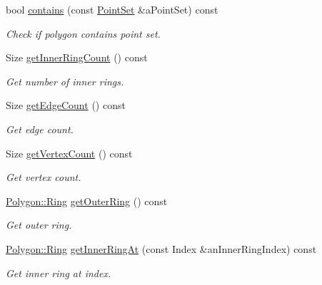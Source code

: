 \begin{DoxyCompactItemize}
bool \hyperlink{classlibrary_1_1math_1_1geom_1_1d2_1_1objects_1_1_polygon_a750ce732c80c9efafa534fc3ae9d8a6f}{contains} (const \hyperlink{classlibrary_1_1math_1_1geom_1_1d2_1_1objects_1_1_point_set}{Point\+Set} \&a\+Point\+Set) const
\begin{DoxyCompactList}\small\item\em Check if polygon contains point set. \end{DoxyCompactList}\item 
Size \hyperlink{classlibrary_1_1math_1_1geom_1_1d2_1_1objects_1_1_polygon_a20d245deda49667f0418591d7772d53d}{get\+Inner\+Ring\+Count} () const
\begin{DoxyCompactList}\small\item\em Get number of inner rings. \end{DoxyCompactList}\item 
Size \hyperlink{classlibrary_1_1math_1_1geom_1_1d2_1_1objects_1_1_polygon_ac01b8f978e663f09ef0f7a91de7720ce}{get\+Edge\+Count} () const
\begin{DoxyCompactList}\small\item\em Get edge count. \end{DoxyCompactList}\item 
Size \hyperlink{classlibrary_1_1math_1_1geom_1_1d2_1_1objects_1_1_polygon_aece2a526c36bbd641588e9742228fb08}{get\+Vertex\+Count} () const
\begin{DoxyCompactList}\small\item\em Get vertex count. \end{DoxyCompactList}\item 
\hyperlink{classlibrary_1_1math_1_1geom_1_1d2_1_1objects_1_1_polygon_aa543e7078b73e1d307ca8317d765cd9c}{Polygon\+::\+Ring} \hyperlink{classlibrary_1_1math_1_1geom_1_1d2_1_1objects_1_1_polygon_a3074bceaa8841e79c843d46377195a0d}{get\+Outer\+Ring} () const
\begin{DoxyCompactList}\small\item\em Get outer ring. \end{DoxyCompactList}\item 
\hyperlink{classlibrary_1_1math_1_1geom_1_1d2_1_1objects_1_1_polygon_aa543e7078b73e1d307ca8317d765cd9c}{Polygon\+::\+Ring} \hyperlink{classlibrary_1_1math_1_1geom_1_1d2_1_1objects_1_1_polygon_ad6014927b89b109098b60861213ea9ed}{get\+Inner\+Ring\+At} (const Index \&an\+Inner\+Ring\+Index) const
\begin{DoxyCompactList}\small\item\em Get inner ring at index. \end{DoxyCompactList}\item 

\end{DoxyCompactItemize}
